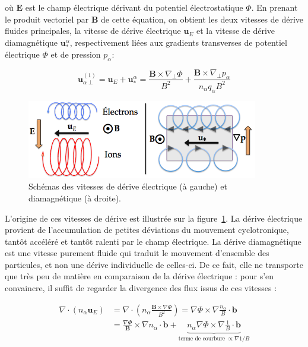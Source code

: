 \begin{refsection}
où $\mathbf E$ est le champ électrique dérivant du potentiel électrostatique
$\Phi$. En prenant le produit vectoriel par $\mathbf B$ de cette équation, on
obtient les deux vitesses de dérive fluides principales, la vitesse de dérive
électrique $\mathbf u_E$ et la vitesse de dérive diamagnétique $\mathbf
u^\alpha_*$, respectivement liées aux gradients transverses de potentiel
électrique $\Phi$ et de pression $p_\alpha$:

\begin{equation}
\label{1-eqVitessesDerive}
\mathbf u_{\alpha\perp}^{(1)}=\mathbf u_E+\mathbf u^\alpha_*=\frac{\mathbf
B\times\nabla_\perp \Phi}{B^2}+\frac{\mathbf B\times\nabla_\perp
p_\alpha}{n_\alpha q_\alpha B^2}
\end{equation}

\begin{figure}[!htbp]
    \centering
	\includegraphics[width=0.9\textwidth]{figures/1-vitessesDerive.png}
	\caption{Schémas des vitesses de dérive électrique (à gauche) et diamagnétique
	(à droite).}
	\label{1-vitessesDerive}
\end{figure}

L'origine de ces vitesses de dérive est illustrée sur la
figure~\ref{1-vitessesDerive}. La dérive électrique provient de l'accumulation
de petites déviations du mouvement cyclotronique, tantôt accéléré et tantôt
ralenti par le champ électrique. La dérive diamagnétique est une vitesse
purement fluide qui traduit le mouvement d'ensemble des particules, et non une
dérive individuelle de celles-ci. De ce fait, elle ne transporte que très peu
de matière en comparaison de la dérive électrique : pour s'en convaincre, il
suffit de regarder la divergence des flux issus de ces vitesses :

\begin{equation}
\label{1-divElecDrift}
\begin{split}
\nabla\cdot\left(n_\alpha\mathbf
u_E\right)&=\nabla\cdot\left(n_\alpha\frac{\mathbf B\times\nabla
\Phi}{B^2}\right) =\nabla \Phi\times\nabla\frac{n_\alpha}{B}\cdot \mathbf b\\
&=\frac{\nabla \Phi}{\mathbf B}\times\nabla n_\alpha\cdot \mathbf
b+\underbrace{n_\alpha\nabla
\Phi\times\nabla\frac{1}{B}\cdot \mathbf b}_{\text{terme de
courbure}\;\propto\nabla 1/B}
\end{split}
\end{equation}


\end{refsection}
